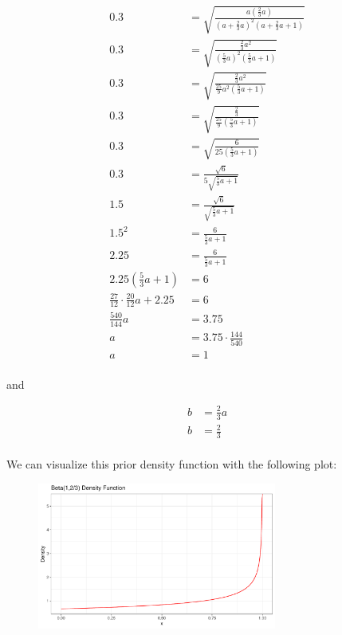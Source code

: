 \documentclass[12pt]{article}
\begin{document}
\begin{align*}
0.3 &= \sqrt{\frac{a\left(\frac{2}{3}a\right)}{(a + \frac{2}{3}a)^2(a + \frac{2}{3}a + 1)}} \\
0.3 &= \sqrt{\frac{\frac{2}{3}a^2}{\left(\frac{5}{3}a\right)^2\left(\frac{5}{3}a + 1\right)}} \\
0.3 &= \sqrt{\frac{\frac{2}{3}a^2}{\frac{25}{9}a^2\left(\frac{5}{3}a + 1\right)}} \\
0.3 &= \sqrt{\frac{\frac{2}{3}}{\frac{25}{9}\left(\frac{5}{3}a + 1\right)}} \\
0.3 &= \sqrt{\frac{6}{25\left(\frac{5}{3}a + 1\right)}} \\
0.3 &= \frac{\sqrt{6}}{5\sqrt{\frac{5}{3}a + 1}} \\
1.5 &= \frac{\sqrt{6}}{\sqrt{\frac{5}{3}a + 1}} \\
1.5^2 &= \frac{6}{\frac{5}{3}a + 1} \\
2.25 &= \frac{6}{\frac{5}{3}a + 1} \\
2.25\left(\frac{5}{3}a + 1\right) &= 6 \\
\frac{27}{12} \cdot \frac{20}{12}a + 2.25 &= 6 \\
\frac{540}{144}a &= 3.75 \\
a &= 3.75 \cdot \frac{144}{540} \\
a &= 1 \\
\end{align*}

and

\begin{align*}
b &= \frac{2}{3}a \\
b &= \frac{2}{3} \\
\end{align*}

We can visualize this prior density function with the following plot:

\begin{figure}[h]
    \centering
    \includegraphics[width=0.7\textwidth]{q3a_plot.pdf}
\end{figure}
\end{document}

